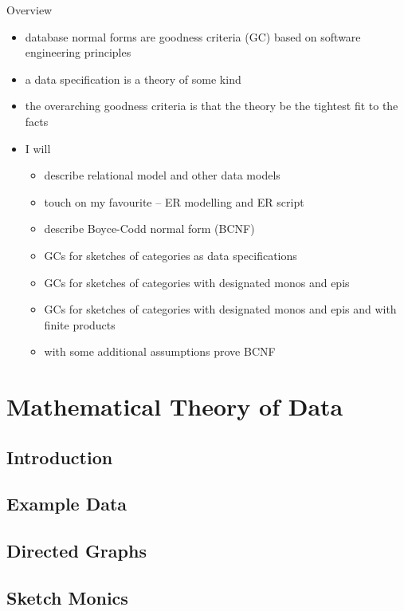 \begin{frame}{Overview}
\begin{itemize}
\item database normal forms are goodness criteria (GC) based on software engineering principles
\pause \item a data specification is a theory of some kind
\pause \item the overarching goodness criteria is that the theory be the tightest fit to the facts
\pause \item I will
\begin{itemize}
   \item describe relational model  and other data models 
   \pause \item touch on my favourite -- ER modelling and ER script
   \pause \item describe Boyce-Codd normal form (BCNF)
   \pause \item GCs for sketches of categories as data specifications 
   \pause \item GCs for sketches of categories with designated monos and epis
   \pause \item GCs for sketches of categories with designated monos and epis and with finite products
  \pause \item with some additional assumptions prove BCNF
\end{itemize}
\end{itemize}
\end{frame}

\section{Mathematical Theory of Data}
\iffalse
\subsection{Introduction}


\subsection{Example Data}


\subsection{Directed Graphs}


\subsection{Sketch Monics}


